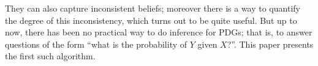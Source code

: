 %
They can also capture inconsistent beliefs;
moreover there is 
a 
way to quantify the degree of this inconsistency,
which turns out to be quite useful.
But up to now,
there has been no practical way to do 
inference 
for
PDGs; that is,
to answer questions of the form ``what is the probability of $Y$ given $X$?''.
This paper presents the first such algorithm.

